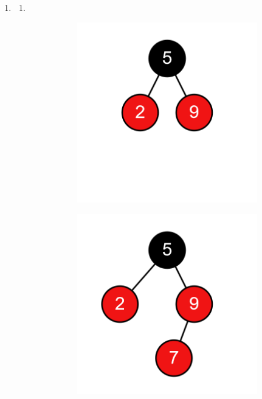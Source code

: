 \documentclass[11pt,a4paper]{article}
\begin{document}
\begin{loesung}
\begin{enumerate}[label=\alph*)]
        \item 
        \begin{enumerate}[label=\roman*)]
            \item \ \\
            \begin{figure}[h!]
                \centering
                \begin{subfigure}[t]{0.15\textwidth}
                    \centering
                    \includegraphics[width=\textwidth]{img/2b/1}
                \end{subfigure}
                \begin{subfigure}[t]{0.15\textwidth}
                    \centering
                    \includegraphics[width=\textwidth]{img/2b/2}

\end{subfigure}
\end{figure}
\end{enumerate}
\end{enumerate}
\end{loesung}
\end{document}
